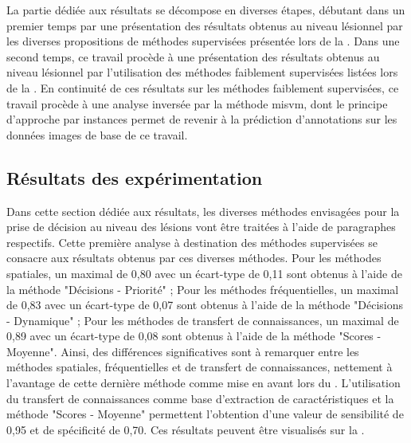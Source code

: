 La partie dédiée aux résultats se décompose en diverses étapes, débutant dans un premier temps par une présentation des résultats obtenus au niveau lésionnel par les diverses propositions de méthodes supervisées présentée lors de la . Dans une second temps, ce travail procède à une présentation des résultats obtenus au niveau lésionnel par l'utilisation des méthodes faiblement supervisées listées lors de la . En continuité de ces résultats sur les méthodes faiblement supervisées, ce travail procède à une analyse inversée par la méthode \gls{misvm}, dont le principe d'approche par instances permet de revenir à la prédiction d'annotations sur les données images de base de ce travail.\par
\clearpage

\subsection{Résultats des expérimentation}
Dans cette section dédiée aux résultats, les diverses méthodes envisagées pour la prise de décision au niveau des lésions vont être traitées à l'aide de paragraphes respectifs. Cette première analyse à destination des méthodes supervisées se consacre aux résultats obtenus par ces diverses méthodes. Pour les méthodes spatiales, un \fscore{} maximal de 0,80 avec un écart-type de 0,11 sont obtenus à l'aide de la méthode "Décisions - Priorité" ; Pour les méthodes fréquentielles, un \fscore{} maximal de 0,83 avec un écart-type de 0,07 sont obtenus à l'aide de la méthode "Décisions - Dynamique" ; Pour les méthodes de transfert de connaissances, un \fscore{} maximal de 0,89 avec un écart-type de 0,08 sont obtenus à l'aide de la méthode "Scores - Moyenne". Ainsi, des différences significatives sont à remarquer entre les méthodes spatiales, fréquentielles et de transfert de connaissances, nettement à l'avantage de cette dernière méthode comme mise en avant lors du . L'utilisation du transfert de connaissances comme base d'extraction de caractéristiques et la méthode "Scores - Moyenne" permettent l'obtention d'une valeur de sensibilité de 0,95 et de spécificité de 0,70. Ces résultats peuvent être visualisés sur la .\par

